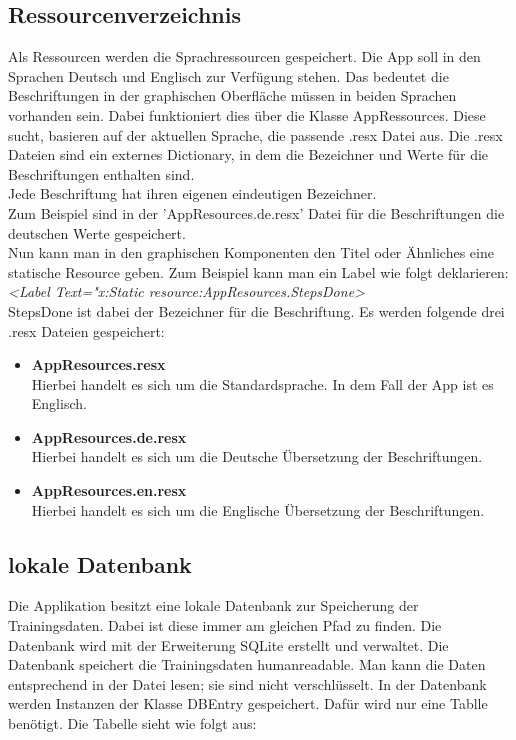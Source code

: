 \documentclass[a4paper,12pt]{article}
\begin{document}
\subsection{Ressourcenverzeichnis}
Als Ressourcen werden die Sprachressourcen gespeichert. Die App soll in den Sprachen Deutsch und Englisch zur Verfügung stehen. Das bedeutet die Beschriftungen in der graphischen Oberfläche müssen in beiden Sprachen vorhanden sein. Dabei funktioniert dies über die Klasse AppRessources. Diese sucht, basieren auf der aktuellen Sprache, die passende .resx Datei aus. Die .resx Dateien sind ein externes Dictionary, in dem die Bezeichner und Werte für die Beschriftungen enthalten sind.\\
Jede Beschriftung hat ihren eigenen eindeutigen Bezeichner. \\Zum Beispiel sind in der 'AppResources.de.resx' Datei für die Beschriftungen die deutschen Werte gespeichert.\\
Nun kann man in den graphischen Komponenten den Titel oder Ähnliches eine statische Resource geben.
Zum Beispiel kann man ein Label wie folgt deklarieren:\\\textit{<Label Text="{x:Static resource:AppResources.StepsDone}>}\\ StepsDone ist dabei der Bezeichner für die Beschriftung.
Es werden folgende drei .resx Dateien gespeichert: 
\begin{itemize}
	\item \textbf{AppResources.resx}\\Hierbei handelt es sich um die Standardsprache. In dem Fall der App ist es Englisch.
	\item \textbf{AppResources.de.resx}\\Hierbei handelt es sich um die Deutsche Übersetzung der Beschriftungen.
	\item \textbf{AppResources.en.resx}\\Hierbei handelt es sich um die Englische Übersetzung der Beschriftungen.
\end{itemize}

\subsection{lokale Datenbank}
Die Applikation besitzt eine lokale \gls{Datenbank} zur Speicherung der Trainingsdaten. Dabei ist diese immer am gleichen Pfad zu finden. Die Datenbank wird mit der Erweiterung \gls{SQLite} erstellt und verwaltet. Die Datenbank speichert die Trainingsdaten humanreadable. Man kann die Daten entsprechend in der Datei lesen; sie sind nicht verschlüsselt. In der Datenbank werden Instanzen der Klasse DBEntry gespeichert. Dafür wird nur eine Tablle benötigt. Die Tabelle sieht wie folgt aus:
\end{document}
